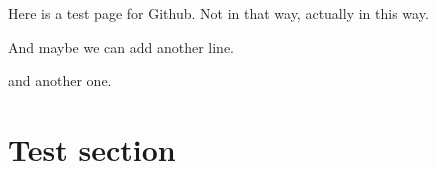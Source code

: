\documentclass{article}
\begin{document}
Here is a test page for Github. Not in that way, actually in this way.

And maybe we can add another line.


and another one.
\section{Test section}
\end{document}
